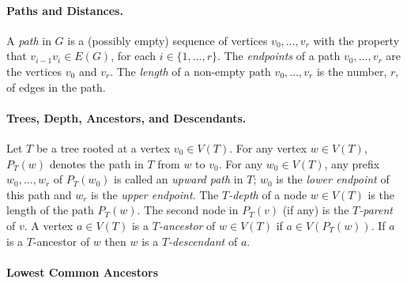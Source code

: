 \documentclass{patmorin}
\DeclareMathOperator{\dist}{dist}
\begin{document}

\paragraph{Paths and Distances.}

A \emph{path} in $G$ is a (possibly empty) sequence of vertices $v_0,\ldots,v_r$ with the property that $v_{i-1}v_i\in E(G)$, for each $i\in\{1,\ldots,r\}$.  The \emph{endpoints} of a path $v_0,\ldots,v_r$ are the vertices $v_0$ and $v_r$.
The \emph{length} of a non-empty path $v_0,\ldots,v_r$ is the number, $r$, of edges in the path.
%

\paragraph{Trees, Depth, Ancestors, and Descendants.}

Let $T$ be a tree rooted at a vertex $v_0\in V(T)$.  For any vertex $w\in V(T)$, $P_T(w)$ denotes the path in $T$ from $w$ to $v_0$.  For any $w_0\in V(T)$, any prefix $w_0,\ldots,w_r$ of $P_T(w_0)$ is called an \emph{upward path} in $T$; $w_0$ is the \emph{lower endpoint} of this path and $w_r$ is the \emph{upper endpoint}.  The \emph{$T$-depth} of a node $w\in V(T)$ is the length of the path $P_T(w)$. The second node in $P_T(v)$ (if any) is the \emph{$T$-parent} of $v$.  A vertex $a\in V(T)$ is a \emph{$T$-ancestor} of $w\in V(T)$ if $a\in V(P_T(w))$. If $a$ is a $T$-ancestor of $w$ then $w$ is a \emph{$T$-descendant} of $a$.



\paragraph{Lowest Common Ancestors}
\end{document}
